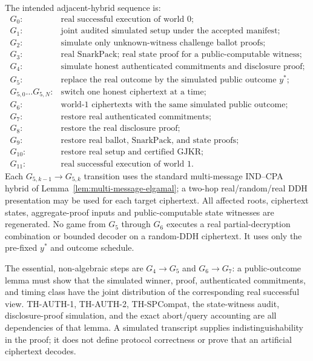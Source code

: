\documentclass[pdflatex,sn-mathphys-num]{sn-jnl}%
\theoremstyle{thmstyleone}%
\theoremstyle{thmstyletwo}%
\theoremstyle{thmstylethree}%
\begin{document}
The intended adjacent-hybrid sequence is:
\[
\begin{array}{ll}
G_0:&\text{real successful execution of world 0};\\
G_1:&\text{joint audited simulated setup under the accepted manifest};\\
G_2:&\text{simulate only unknown-witness challenge ballot proofs};\\
G_3:&\text{real SnarkPack; real state proof for a public-computable witness};\\
G_4:&\text{simulate honest authenticated commitments and disclosure proof};\\
G_5:&\text{replace the real outcome by the simulated public outcome $y^*$};\\
G_{5,0}\ldots G_{5,N}:&\text{switch one honest ciphertext at a time};\\
G_6:&\text{world-1 ciphertexts with the same simulated public outcome};\\
G_7:&\text{restore real authenticated commitments};\\
G_8:&\text{restore the real disclosure proof};\\
G_9:&\text{restore real ballot, SnarkPack, and state proofs};\\
G_{10}:&\text{restore real setup and certified GJKR};\\
G_{11}:&\text{real successful execution of world 1}.
\end{array}
\]
Each $G_{5,k-1}\rightarrow G_{5,k}$ transition uses the standard
multi-message IND--CPA hybrid of Lemma~\ref{lem:multi-message-elgamal}; a
two-hop real/random/real DDH presentation may be used for each target
ciphertext.  All affected roots, ciphertext states, aggregate-proof inputs and
public-computable state witnesses are regenerated.  No game from $G_5$ through
$G_6$ executes a real partial-decryption combination or bounded decoder on a
random-DDH ciphertext.  It uses only the pre-fixed $y^*$ and outcome schedule.

The essential, non-algebraic steps are $G_4\rightarrow G_5$ and
$G_6\rightarrow G_7$: a public-outcome lemma must show that the simulated
winner, proof, authenticated commitments, and timing class have the joint
distribution of the corresponding real successful view.  TH-AUTH-1,
TH-AUTH-2, TH-SPCompat, the state-witness audit, disclosure-proof simulation,
and the exact abort/query accounting are all dependencies of that lemma.  A
simulated transcript supplies indistinguishability in the proof; it does not
define protocol correctness or prove that an artificial ciphertext decodes.
\end{document}
